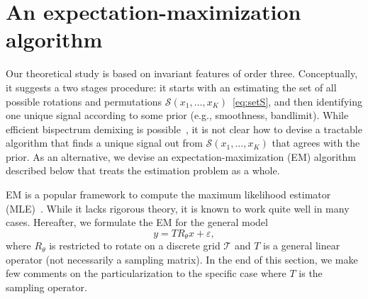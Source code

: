 \documentclass[english,12pt]{article}
\newcommand{\TODO}[1]{{\color{red}{[#1]}}}
\numberwithin{equation}{section}
\numberwithin{thm}{section} %
\begin{document}
\TODO{Here we should explain an important consequence: one can sub-sample the autocorrelation}




\section{An expectation-maximization algorithm }
\label{sec:EM}

Our theoretical study is based on invariant features of order three. Conceptually, it suggests a two stages procedure: it starts with an estimating the set of all possible rotations and permutations $\mathcal{S}(x_1,\ldots,x_K)$~\eqref{eq:setS}, and then identifying one unique signal according to some prior (e.g., smoothness, bandlimit).
While efficient bispectrum demixing is possible~\cite{boumal2018heterogeneous,weinthesis}, it is not clear how to devise a tractable algorithm that finds a unique signal out from $\mathcal{S}(x_1,\ldots,x_K)$ that agrees with the prior.  %
As an alternative, we devise an expectation-maximization (EM) algorithm described below that treats the estimation problem as a whole.

EM is a popular  framework to compute the  maximum likelihood estimator (MLE)~\cite{dempster1977maximum}. While it lacks rigorous theory, it is known to work quite well in many cases. 
Hereafter, we formulate the EM for the general model
\begin{equation}
y = T R_\theta x + \varepsilon, 
\end{equation}
where $R_\theta$ is restricted to rotate on a discrete grid $\mathcal{T}$ and $T$  is a general linear operator (not necessarily a sampling matrix).
In the end of this section, we make few comments on the particularization to the specific case where $T$ is the sampling operator.
\end{document}

